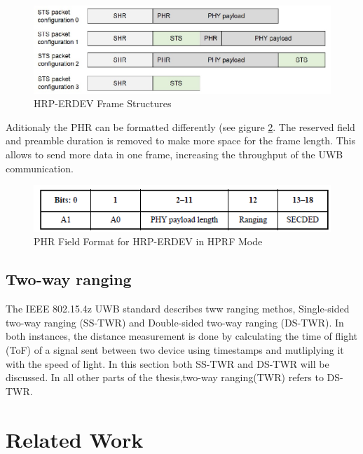 \begin{figure}[ht!]
\centering
\includegraphics[width=\linewidth]{graphics/HRP_ERDEV_frame_structures.jpg}
\caption{HRP-ERDEV Frame Structures \cite{hsu_2021}}
\label{f:HRP-erdev frame}
\end{figure}

Aditionaly the PHR can be formatted differently (see gigure \ref{f:PHR 4z}. 
The reserved field and preamble duration is removed to make more space for the frame length. This allows to send more data in one frame, increasing the throughput of the UWB communication.

\begin{figure}[ht!]
\centering
\includegraphics[width=\linewidth]{graphics/HRP_ERDEV_HPRF_mode_PHR.png}
\caption{PHR Field Format for HRP-ERDEV in HPRF Mode \cite{IEEE4z}}
\label{f:PHR 4z}
\end{figure}


\subsection{Two-way ranging}
\label{ss:two_way_ranging}
The IEEE 802.15.4z UWB standard describes tww ranging methos, Single-sided two-way ranging (SS-TWR) and Double-sided two-way ranging (DS-TWR).
In both instances, the distance measurement is done by calculating the time of flight (ToF) of a signal sent between two device using timestamps and mutliplying it with the speed of light. 
In this section both SS-TWR and DS-TWR will be discussed.
In all other parts of the thesis,two-way ranging(TWR) refers to DS-TWR.




\section{Related Work} %


